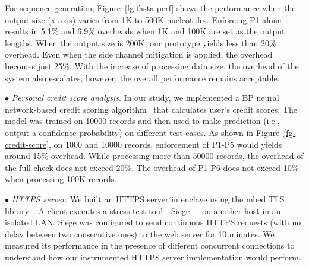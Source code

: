 
%
%
%

For sequence generation, Figure~\ref{fg-fasta-perf} shows the performance when the output size (x-axis) varies from 1K to 500K nucleotides. Enforcing P1 alone results in 5.1\% and 6.9\% overheads when 1K and 100K are set as the output lengths. When the output size is 200K, our prototype yields less than 20\% overhead. Even when the side channel mitigation is applied, the overhead becomes just 25\%. With the increase of processing data size, the overhead of the system also escalates; however, the overall performance remains acceptable.


\vspace{2pt}\noindent$\bullet$\textit{ Personal credit score analysis}. In our study, we implemented a BP neural network-based credit scoring algorithm~\cite{jensen1992using} that calculates user's credit scores. The model was trained on 10000 records and then used to make prediction (i.e., output a confidence probability) on different test cases.
As shown in Figure~\ref{fg-credit-score}, on 1000 and 10000 records, enforcement of P1-P5 would yields around 15\% overhead. 
While processing more than 50000 records, the overhead of the full check does not exceed 20\%.  The overhead of P1-P6 does not exceed 10\% when processing 100K records.


%

\vspace{2pt}\noindent$\bullet$\textit{ HTTPS server}. We built an HTTPS server in enclave using the mbed TLS library~\cite{mbedtls}. 
A client executes a stress test tool - Siege~\cite{siege} - on another host in an isolated LAN. Siege was configured to send continuous HTTPS requests (with no delay between two consecutive ones) to the web server for 10 minutes. We measured its performance in the presence of different concurrent connections to understand how our instrumented HTTPS server implementation would perform. 

%

